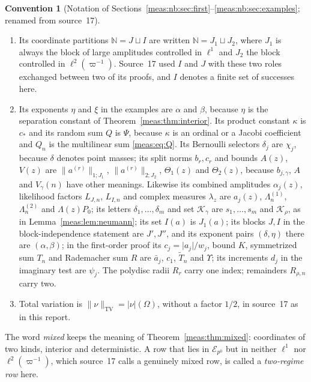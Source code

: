 \documentclass[11pt]{article}
\numberwithin{equation}{section}
\theoremstyle{definition}
\newtheorem{convention}[theorem]{Convention}
\theoremstyle{remark}
\newcommand{\N}{\mathbb N}
\newcommand{\TV}{\mathrm{TV}}
\newcommand{\norm}[1]{\lVert#1\rVert}
\newcommand{\abs}[1]{\lvert#1\rvert}
\newcommand{\Erow}{\mathcal E_{p^0}}
\begin{document}
\begin{convention}[Notation of
Sections~\ref{meas:nb:sec:first}--\ref{meas:nb:sec:examples}; renamed from
source~17]
\begin{enumerate}[label=(\alph*)]
the objects coincide. Its limit densities $F_\gamma$ are written $H_\rho$, as in
\eqref{meas:eq:density-measure}. Its complex-parameter likelihoods $D_n(z)$, $D(z)$
and Taylor coefficients $G_{k,n}$, $G_k$ are $\Lambda_n(z)$, $\Lambda(z)$,
$\Lambda_{k,n}$, $\Lambda_k$, because $D$ is the set of finite-success paths and
$G$ a group.
\item Its coordinate partitions $\N=J\sqcup I$ are written $\N=J_1\sqcup J_2$,
where $J_1$ is always the block of large amplitudes controlled in $\ell^1$ and
$J_2$ the block controlled in $\ell^2(\varpi^{-1})$. Source~17 used $I$ and $J$
with these two roles exchanged between two of its proofs, and $I$ denotes a
finite set of successes here.
\item Its exponents $\eta$ and $\xi$ in the examples are $\alpha$ and $\beta$,
because $\eta$ is the separation constant of Theorem~\ref{meas:thm:interior}. Its
product constant $\kappa$ is $c_*$ and its random sum $Q$ is $\Psi$, because
$\kappa$ is an ordinal or a Jacobi coefficient and $Q_n$ is the multilinear sum
\eqref{meas:eq:Q}. Its Bernoulli selectors $\delta_j$ are $\chi_j$, because
$\delta$ denotes point masses; its split norms $b_r,c_r$ and bounds $A(z)$, $V(z)$
are $\norm{a^{(r)}}_{1;J_1}$, $\norm{a^{(r)}}_{2;J_2}$, $\Theta_1(z)$ and
$\Theta_2(z)$, because $b_{j,\gamma}$, $A$ and $V_\gamma(n)$ have other meanings.
Likewise its combined amplitudes $\alpha_j(z)$, likelihood factors $L_{J,n}$,
$L_{I,n}$ and complex measures $\lambda_z$ are $a_j(z)$, $\Lambda^{(1)}_n$,
$\Lambda^{(2)}_n$ and $\Lambda(z)P_0$; its letters $\delta_1,\ldots,\delta_m$ and set
$\mathcal K_\gamma$ are $s_1,\ldots,s_m$ and $\mathcal K_\rho$, as in
Lemma~\ref{meas:lem:neumann}; its set $I(a)$ is $J_1(a)$; its blocks $J,I$ in the
block-independence statement are $J',J''$, and its exponent pairs $(\delta,\eta)$
there are $(\alpha,\beta)$; in the first-order proof its $c_j=\abs{a_j}/w_j$, bound
$K$, symmetrized sum $T_n$ and Rademacher sum $R$ are $\bar a_j$, $c_1$,
$\widetilde T_n$ and $\Upsilon$; its increments $d_j$ in the imaginary test are
$\psi_j$. The polydisc radii $R_r$ carry one index; remainders $R_{\rho,n}$ carry
two.
\item Total variation is $\norm{\nu}_\TV=\abs\nu(\Omega)$, without a factor
$1/2$, in source~17 as in this report.
\end{enumerate}
The word \emph{mixed} keeps the meaning of Theorem~\ref{meas:thm:mixed}:
coordinates of two kinds, interior and deterministic. A row that lies in
$\Erow$ but in neither $\ell^1$ nor $\ell^2(\varpi^{-1})$, which source~17 calls a
genuinely mixed row, is called a \emph{two-regime row} here.
\end{convention}
\end{document}
